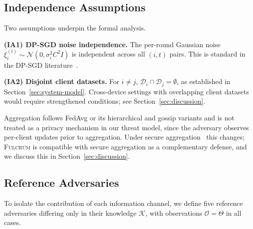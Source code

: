 \documentclass[letterpaper,journal]{IEEEtran}
\newcommand{\Fulcrum}{\textsc{Fulcrum}\xspace}
\begin{document}
\subsection{Independence Assumptions}
\label{sec:independence}

\noindent Two assumptions underpin the formal analysis.\medskip

\noindent\textbf{(IA1) DP-SGD noise independence.} The per-round
Gaussian noise $\xi_i^{(t)} \sim \mathcal{N}(0, \sigma_i^2 C^2 I)$
is independent across all $(i, t)$ pairs. This is standard in the
DP-SGD literature~\cite{abadi2016dpsgd}.\medskip

\noindent\textbf{(IA2) Disjoint client datasets.} For $i \neq j$,
$\mathcal{D}_i \cap \mathcal{D}_j = \emptyset$, as established in
Section~\ref{sec:system-model}. Cross-device settings with overlapping client datasets would require strengthened conditions; see Section~\ref{sec:discussion}.\medskip

\noindent Aggregation follows FedAvg or its hierarchical and gossip
variants and is not treated as a privacy mechanism in our threat
model, since the adversary observes per-client updates prior to
aggregation. Under secure aggregation~\cite{bonawitz2017secagg} this
changes; \Fulcrum is compatible with secure aggregation as a
complementary defense, and we discuss this in
Section~\ref{sec:discussion}.

\subsection{Reference Adversaries}
\label{sec:reference-adv}

To isolate the contribution of each information channel, we define
five reference adversaries differing only in their knowledge
$\mathcal{K}$, with observations $\mathcal{O} = \Theta$ in all
cases.
\end{document}
